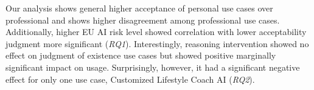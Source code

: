 \begin{comment}

To answer these questions, we develop two surveys to collect judgments and reasoning processes of 397 demographically diverse people with varying levels of experience with AI. We collect judgments on ten different use cases, five personal use cases and five professional use cases (Figure \ref{fig:survey-flow}). We explored these two categories of use cases varied along relevant dimensions, EU AI risk level for personal use cases and required education level of entry for professional use (see \S~\ref{sec:study-design}). 


\end{comment}
Our analysis shows general higher acceptance of personal use cases over professional and shows higher disagreement among professional use cases. Additionally, higher EU AI risk level showed correlation with lower acceptability judgment more significant (\textit{RQ1}). Interestingly, reasoning intervention showed no effect on judgment of existence use cases but showed positive marginally significant impact on usage. Surprisingly, however, it had a significant negative effect for only one use case, Customized Lifestyle Coach AI (\textit{RQ2}). 

